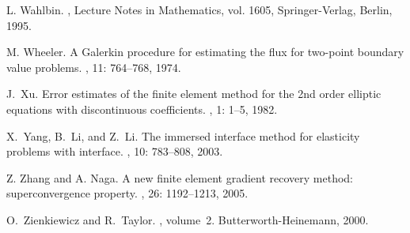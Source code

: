 \documentclass[11pt]{article}
\numberwithin{equation}{section}
\begin{document}
\begin{thebibliography}{99}
L. Wahlbin.
,
  Lecture Notes in Mathematics, vol. 1605, Springer-Verlag, Berlin, 1995.

M. Wheeler. A {G}alerkin procedure for estimating the flux for two-point boundary value problems.
, 11:  764--768, 1974.

J.~Xu.
Error estimates of the finite element method for the 2nd order elliptic equations with discontinuous coefficients.
, 1: 1--5, 1982.

X.~Yang, B.~Li, and Z.~Li.
The immersed interface method for elasticity problems with interface.
, 10:  783--808, 2003.

Z. Zhang and A. Naga.
A new finite element gradient recovery  method: superconvergence property.
, 26: 1192--1213, 2005.

O.~Zienkiewicz and R.~Taylor.
, volume~2.
\newblock Butterworth-{H}einemann, 2000.
\end{thebibliography}
\end{document}
